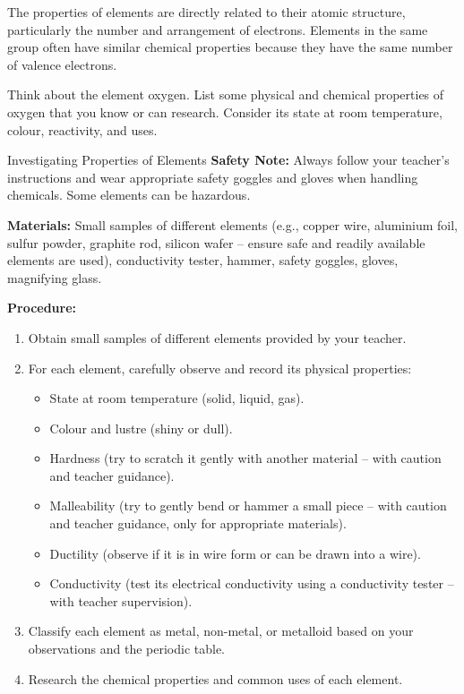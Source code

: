 The properties of elements are directly related to their atomic structure, particularly the number and arrangement of electrons.  Elements in the same group often have similar chemical properties because they have the same number of valence electrons.

\begin{stopandthink}
Think about the element oxygen.  List some physical and chemical properties of oxygen that you know or can research.  Consider its state at room temperature, colour, reactivity, and uses.
\end{stopandthink}

\begin{investigation}{Investigating Properties of Elements}
\textbf{Safety Note:}  Always follow your teacher's instructions and wear appropriate safety goggles and gloves when handling chemicals.  Some elements can be hazardous.

\textbf{Materials:} Small samples of different elements (e.g., copper wire, aluminium foil, sulfur powder, graphite rod, silicon wafer – ensure safe and readily available elements are used), conductivity tester, hammer, safety goggles, gloves, magnifying glass.

\textbf{Procedure:}
\begin{enumerate}
    \item Obtain small samples of different elements provided by your teacher.
    \item For each element, carefully observe and record its physical properties:
        \begin{itemize}
            \item State at room temperature (solid, liquid, gas).
            \item Colour and lustre (shiny or dull).
            \item Hardness (try to scratch it gently with another material – with caution and teacher guidance).
            \item Malleability (try to gently bend or hammer a small piece – with caution and teacher guidance, only for appropriate materials).
            \item Ductility (observe if it is in wire form or can be drawn into a wire).
            \item Conductivity (test its electrical conductivity using a conductivity tester – with teacher supervision).
        \end{itemize}
    \item Classify each element as metal, non-metal, or metalloid based on your observations and the periodic table.
    \item Research the chemical properties and common uses of each element.
\end{enumerate}


\end{investigation}
